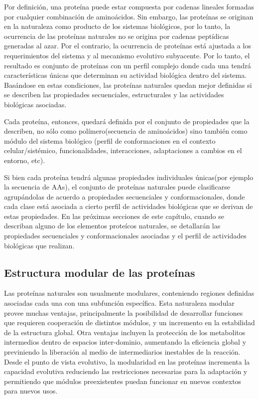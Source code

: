 Por definición, una proteína puede estar compuesta por cadenas lineales formadas por cualquier combinación de aminoácidos.
Sin embargo, las proteínas se originan en la naturaleza como producto de los sistemas biológicos, por lo tanto, 
la ocurrencia de las proteínas naturales no se origina por cadenas peptídicas generadas al azar. 
Por el contrario, la ocurrencia de proteínas está ajustada a los requerimientos del sistema y al mecanismo evolutivo subyacente. 
Por lo tanto, el resultado es conjunto de proteínas con un perfil complejo donde cada una tendrá características únicas que determinan su actividad biológica dentro del sistema.
Basándose en estas condiciones, las proteínas naturales quedan mejor definidas si se describen las propiedades secuenciales, estructurales y las actividades biológicas asociadas. 

Cada proteína, entonces, quedará definida por el conjunto de propiedades que la describen, no sólo como polímero(secuencia de aminoácidos) 
sino también como módulo del sistema biológico (perfil de conformaciones en el contexto celular/sistémico, funcionalidades, interacciones, adaptaciones a cambios en el entorno, etc). 

Si bien cada proteína tendrá algunas propiedades individuales únicas(por ejemplo la secuencia de AAs), 
el conjunto de proteínas naturales puede clasificarse 
agrupándolas de acuerdo a propiedades secuenciales y conformacionales, donde cada clase está asociada a cierto perfil de actividades biológicas que se derivan de estas propiedades.
En las próximas secciones de este capítulo, cuando se describan alguno de los elementos proteícos naturales, 
se detallarán las propiedades secuenciales y conformacionales asociadas y el perfil de actividades biológicas que realizan.









\subsection{Estructura modular de las proteínas}

Las proteínas naturales son usualmente modulares, conteniendo regiones definidas asociadas cada una con una subfunción específica.
Esta naturaleza modular provee muchas ventajas, principalmente la posibilidad de desarrollar funciones que requieren cooperación de distintos módulos, y un incremento en la estabilidad de la estructura global.
Otra ventajas incluyen la protección de los metabolitos intermedios dentro de espacios inter-dominio, aumentando la eficiencia global y previniendo la liberación al medio de intermediarios inestables de la reacción.  
Desde el punto de vista evolutivo, la modularidad en las proteínas incrementa la capacidad evolutiva reduciendo las restricciones necesarias 
para la adaptación y permitiendo que módulos preexistentes puedan funcionar en nuevos contextos para nuevos usos.

